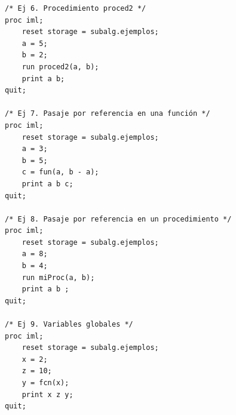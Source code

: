 \documentclass[]{book}
\begin{document}
\begin{verbatim}
/* Ej 6. Procedimiento proced2 */
proc iml;
    reset storage = subalg.ejemplos;
    a = 5;
    b = 2;
    run proced2(a, b);
    print a b; 
quit;

/* Ej 7. Pasaje por referencia en una función */
proc iml;
    reset storage = subalg.ejemplos;
    a = 3;
    b = 5;
    c = fun(a, b - a);
    print a b c; 
quit;

/* Ej 8. Pasaje por referencia en un procedimiento */
proc iml;
    reset storage = subalg.ejemplos;
    a = 8;
    b = 4;
    run miProc(a, b);
    print a b ; 
quit;

/* Ej 9. Variables globales */
proc iml;
    reset storage = subalg.ejemplos;
    x = 2;
    z = 10;
    y = fcn(x);
    print x z y; 
quit;
\end{verbatim}


\end{document}
